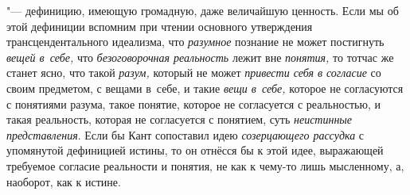 "--- дефиницию, имеющую громадную, даже величайшую ценность.
Если мы об этой дефиниции вспомним при чтении основного утверждения
трансцендентального идеализма, что
{\em разумное} познание
не может постигнуть {\em вещей в~себе,}
что {\em безоговорочная
реальность} лежит вне
{\em понятия,} то тотчас
же станет ясно, что такой {\em разум,}
который не может
{\em привести себя в согласие}
со своим предметом, с вещами в~себе, и такие
{\em вещи в~себе,}
которое не согласуются с понятиями разума, такое понятие,
которое не согласуется с реальностью, и такая реальность, которая не
согласуется с понятием, суть
{\em неистинные представления}.
Если бы Кант сопоставил идею
{\em созерцающего рассудка}
с упомянутой дефиницией истины, то он отнёсся бы к этой идее,
выражающей требуемое согласие реальности и понятия, не как к чему-то лишь
мысленному, а, наоборот, как к истине.

